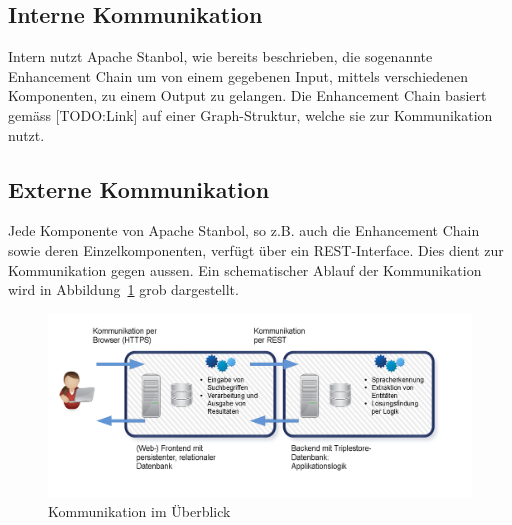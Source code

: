 \subsection{Interne Kommunikation}
\label{sec:architektur_schnittstellen_intern}
Intern nutzt Apache Stanbol, wie bereits beschrieben, die sogenannte Enhancement Chain um von einem gegebenen Input, mittels verschiedenen Komponenten, zu einem Output zu gelangen. Die Enhancement Chain basiert gemäss [TODO:Link] auf einer Graph-Struktur, welche sie zur Kommunikation nutzt.

\subsection{Externe Kommunikation}
\label{sec:architektur_schnittstellen_extern}
Jede Komponente von Apache Stanbol, so z.B. auch die Enhancement Chain sowie deren Einzelkomponenten, verfügt über ein REST-Interface. Dies dient zur Kommunikation gegen aussen. Ein schematischer Ablauf der Kommunikation wird in Abbildung~\ref{fig:kommunikationKomponenten} grob dargestellt.

\begin{figure}[H]
	\centering
	\includegraphics[scale=0.4]{bilder/software_komponenten.png}
	\caption{Kommunikation im Überblick}
\label{fig:kommunikationKomponenten}
\end{figure}
